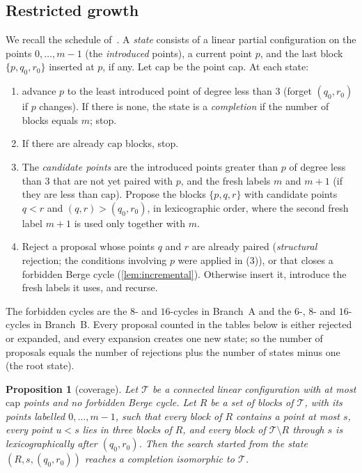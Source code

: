 \documentclass[11pt]{amsart}
\newtheorem{proposition}[theorem]{Proposition}
\theoremstyle{definition}
\theoremstyle{remark}
\begin{document}
\subsection{Restricted growth}
We recall the schedule of~\cite[§3]{Tranquilli2026}. A \emph{state} consists of a
linear partial configuration on the points $0,\dots,m-1$ (the
\emph{introduced} points), a current point $p$, and the last block
$\{p,q_0,r_0\}$ inserted at $p$, if any. Let $\mathrm{cap}$ be the point cap. At
each state:
\begin{enumerate}[leftmargin=2em,label=(\arabic*)]
\item advance $p$ to the least introduced point of degree less than $3$ (forget
  $(q_0,r_0)$ if $p$ changes). If there is none, the state is a
  \emph{completion} if the number of blocks equals $m$; stop.
\item If there are already $\mathrm{cap}$ blocks, stop.
\item The \emph{candidate points} are the introduced points greater than $p$
  of degree less than $3$ that are not yet paired with $p$, and the fresh labels
  $m$ and $m+1$ (if they are less than $\mathrm{cap}$). Propose the blocks
  $\{p,q,r\}$ with candidate points $q<r$ and $(q,r)>(q_0,r_0)$, in
  lexicographic order, where the second fresh label $m+1$ is used only together
  with $m$.
\item Reject a proposal whose points $q$ and $r$ are already paired
  (\emph{structural} rejection; the conditions involving $p$ were applied in
  (3)), or that closes a forbidden Berge cycle (\cref{lem:incremental}).
  Otherwise insert it, introduce the fresh labels it uses, and recurse.
\end{enumerate}
The forbidden cycles are the $8$- and $16$-cycles in Branch~A and the $6$-, $8$-
and $16$-cycles in Branch~B. Every proposal counted in the tables below is
either rejected or expanded, and every expansion creates one new state; so the
number of proposals equals the number of rejections plus the number of states
minus one (the root state).

\begin{proposition}[coverage]\label{prop:coverage}
Let $\mathcal T$ be a connected linear configuration with at most
$\mathrm{cap}$ points and no forbidden Berge cycle. Let $R$ be a set of blocks of
$\mathcal T$, with its points labelled $0,\dots,m-1$, such that every block of
$R$ contains a point at most $s$, every point $u<s$ lies in three blocks of
$R$, and every block of $\mathcal T\setminus R$ through $s$ is
lexicographically after $(q_0,r_0)$. Then the search started from
the state $(R,s,(q_0,r_0))$ reaches a completion isomorphic to $\mathcal T$.
\end{proposition}
\end{document}
